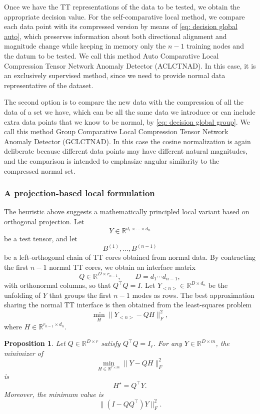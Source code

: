 \documentclass{article}
\newtheorem{proposition}{Proposition}[section]
\begin{document}
Once we have the TT representations of the data to be tested, we obtain the appropriate decision value. For the self-comparative local method, we compare each data point with its compressed version by means of \eqref{eq: decision global auto}, which preserves information about both directional alignment and magnitude change while keeping in memory only the $n-1$ training nodes and the datum to be tested. We call this method Auto Comparative Local Compression Tensor Network Anomaly Detector (ACLCTNAD). In this case, it is an exclusively supervised method, since we need to provide normal data representative of the dataset.

The second option is to compare the new data with the compression of all the data of a set we have, which can be all the same data we introduce or can include extra data points that we know to be normal, by \eqref{eq: decision global group}. We call this method Group Comparative Local Compression Tensor Network Anomaly Detector (GCLCTNAD). In this case the cosine normalization is again deliberate because different data points may have different natural magnitudes, and the comparison is intended to emphasize angular similarity to the compressed normal set.

\subsubsection{A projection-based local formulation}
The heuristic above suggests a mathematically principled local variant based on orthogonal projection. Let
\[
    Y\in\mathbb{R}^{d_1\times\cdots\times d_n}
\]
be a test tensor, and let
\[
    B^{(1)},\dots,B^{(n-1)}
\]
be a left-orthogonal chain of TT cores obtained from normal data. By contracting the first $n-1$ normal TT cores, we obtain an interface matrix
\[
    Q\in\mathbb{R}^{D\times r_{n-1}},\qquad D=d_1\cdots d_{n-1},
\]
with orthonormal columns, so that $Q^\top Q=I$. Let $Y_{<n>}\in\mathbb{R}^{D\times d_n}$ be the unfolding of $Y$ that groups the first $n-1$ modes as rows. The best approximation sharing the normal TT interface is then obtained from the least-squares problem
\begin{equation}
    \min_H\lVert Y_{<n>}-QH\rVert_F^2,
\end{equation}
where $H\in\mathbb{R}^{r_{n-1}\times d_n}$.

\begin{proposition}
Let $Q\in\mathbb{R}^{D\times r}$ satisfy $Q^\top Q=I_r$. For any
$Y\in\mathbb{R}^{D\times m}$, the minimizer of
\[
    \min_{H\in\mathbb{R}^{r\times m}}
    \lVert Y-QH\rVert_F^2
\]
is
\[
    H^\star = Q^\top Y.
\]
Moreover, the minimum value is
\[
    \lVert (I-QQ^\top)Y\rVert_F^2.
\]
\end{proposition}
\end{document}

